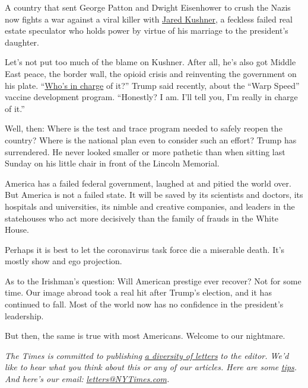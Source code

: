 A country that sent George Patton and Dwight Eisenhower to crush the
Nazis now fights a war against a viral killer with
\href{https://www.nytimes3xbfgragh.onion/2020/05/05/us/jared-kushner-fema-coronavirus.html}{Jared
Kushner}, a feckless failed real estate speculator who holds power by
virtue of his marriage to the president's daughter.

Let's not put too much of the blame on Kushner. After all, he's also got
Middle East peace, the border wall, the opioid crisis and reinventing
the government on his plate.
``\href{https://www.whitehouse.gov/briefings-statements/remarks-president-trump-meeting-governor-murphy-new-jersey/}{Who's
in charge} of it?'' Trump said recently, about the ``Warp Speed''
vaccine development program. ``Honestly? I am. I'll tell you, I'm really
in charge of it.''

Well, then: Where is the test and trace program needed to safely reopen
the country? Where is the national plan even to consider such an effort?
Trump has surrendered. He never looked smaller or more pathetic than
when sitting last Sunday on his little chair in front of the Lincoln
Memorial.

America has a failed federal government, laughed at and pitied the world
over. But America is not a failed state. It will be saved by its
scientists and doctors, its hospitals and universities, its nimble and
creative companies, and leaders in the statehouses who act more
decisively than the family of frauds in the White House.

Perhaps it is best to let the coronavirus task force die a miserable
death. It's mostly show and ego projection.

As to the Irishman's question: Will American prestige ever recover? Not
for some time. Our image abroad took a real hit after Trump's election,
and it has continued to fall. Most of the world now has no confidence in
the president's leadership.

But then, the same is true with most Americans. Welcome to our
nightmare.

\emph{The Times is committed to publishing}
\href{https://www.nytimes3xbfgragh.onion/2019/01/31/opinion/letters/letters-to-editor-new-york-times-women.html}{\emph{a
diversity of letters}} \emph{to the editor. We'd like to hear what you
think about this or any of our articles. Here are some}
\href{https://help.nytimes3xbfgragh.onion/hc/en-us/articles/115014925288-How-to-submit-a-letter-to-the-editor}{\emph{tips}}\emph{.
And here's our email:}
\href{mailto:letters@NYTimes.com}{\emph{letters@NYTimes.com}}\emph{.}

